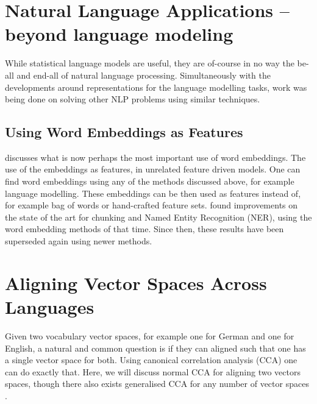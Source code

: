 \documentclass[parskip]{komatufte}
\begin{document}






\section{Natural Language Applications -- beyond language modeling}
While statistical language models are useful, they are of-course in no way the be-all and end-all of natural language processing.
Simultaneously with the developments around representations for the language modelling tasks, work was being done on solving other NLP problems using similar techniques.



\subsection{Using Word Embeddings as Features}


 discusses what is now perhaps the most important use of word embeddings.
The use of the embeddings as features, in unrelated feature driven models.
One can find word embeddings using any of the methods discussed above, for example language modelling.
These embeddings can be then used as features instead of, for example bag of words or hand-crafted feature sets.
 found improvements on the state of the art for chunking and Named Entity Recognition (NER), using the word embedding methods of that time.
Since then, these results have been superseded again using newer methods.



\section{Aligning Vector Spaces Across Languages}
Given two vocabulary vector spaces, for example one for German and one for English,
a natural and common question is if they can aligned such that one has a single vector space for both.
Using canonical correlation analysis (CCA) one can do exactly that.
Here, we will discuss normal CCA for aligning two vectors spaces,
though there also exists generalised CCA for any number of vector spaces .
\end{document}
